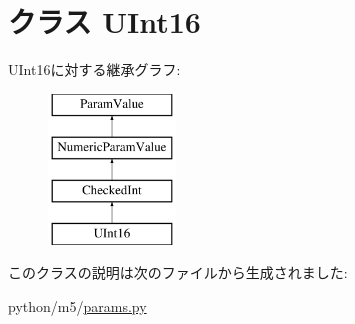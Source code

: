\hypertarget{classm5_1_1params_1_1UInt16}{
\section{クラス UInt16}
\label{classm5_1_1params_1_1UInt16}
}
UInt16に対する継承グラフ:\begin{figure}[H]
\begin{center}
\leavevmode
\includegraphics[height=4cm]{classm5_1_1params_1_1UInt16}
\end{center}
\end{figure}


このクラスの説明は次のファイルから生成されました:\begin{DoxyCompactItemize}
\item 
python/m5/\hyperlink{params_8py}{params.py}\end{DoxyCompactItemize}

